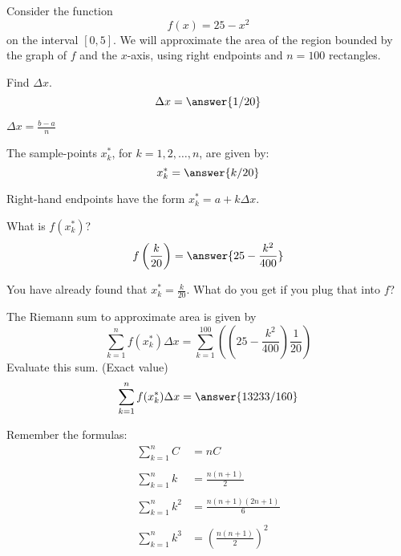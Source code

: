 \documentclass{ximera}
\author{Nela Lakos \and Kyle Parsons \and Bobby Ramsey}
\begin{document}
Consider the function
\[
f(x) = 25 - x^2
\]
on the interval $[0,5]$.  We will approximate the area of the region bounded by the graph of $f$ and the $x$-axis, using
right endpoints and $n=100$ rectangles.

\begin{exercise}
	Find $\Delta x$.
	\[ \Delta x = \answer{1/20} \]
	\begin{hint}
		$\Delta x = \frac{b-a}{n}$
	\end{hint}
	\begin{exercise}
		The sample-points $x_k^*$, for $k = 1, 2, \ldots, n$, are given by:
		\[ x_k^* = \answer{k/20} \]
		\begin{hint}
			Right-hand endpoints have the form $x_k^* = a + k \Delta x$.
		\end{hint}	
		\begin{exercise}
			What is $f( x_k^* )$?
			\[ f\left( \frac{k}{20} \right) = \answer{25-\frac{k^2}{400}} \]
			\begin{hint}
				You have already found that $x_k^* = \frac{k}{20}$.  What do you get if you plug that into $f$?
			\end{hint}
			\begin{exercise}
				The Riemann sum to approximate area is given by
				\[ \sum_{k=1}^{n} f(x_k^*) \Delta x = \sum_{k=1}^{100} \left( \left( 25 - \frac{k^2}{400}\right) \frac{1}{20} \right)\]
				Evaluate this sum. (Exact value)
				\[ \sum_{k=1}^{n} f(x_k^*) \Delta x = \answer{13233/160} \]
				\begin{hint}
					Remember the formulas:
					\begin{align*}
						\sum_{k=1}^{n}  C &= nC\\ \\
						\sum_{k=1}^{n}  k &= \frac{n(n+1)}{2}\\ \\
						\sum_{k=1}^{n}  k^2 &= \frac{n(n+1)(2n+1)}{6}\\ \\
						\sum_{k=1}^{n}  k^3 &= \left( \frac{n(n+1)}{2}\right)^2
					\end{align*}
				\end{hint}
			\end{exercise}			
		\end{exercise}
	\end{exercise}

\end{exercise}
\end{document}
